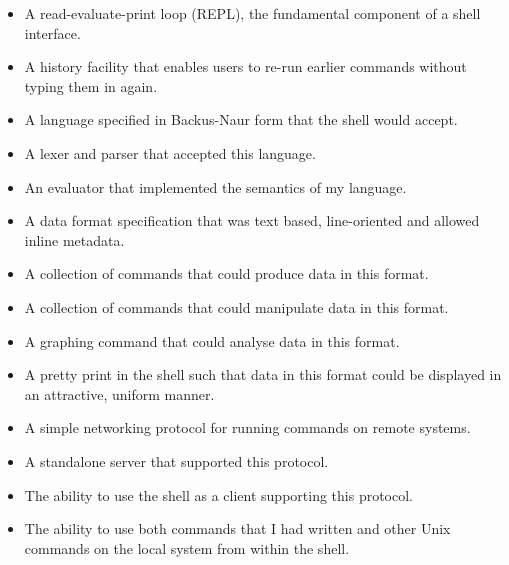 \documentclass[12pt,twoside,notitlepage]{report}
\begin{document}
\begin{itemize}
\item A read-evaluate-print loop (REPL), the fundamental component of
  a shell interface.
\item A history facility that enables users to re-run earlier commands
  without typing them in again.
\item A language specified in Backus-Naur form that the shell would
  accept.
\item A lexer and parser that accepted this language.
\item An evaluator that implemented the semantics of my language.
\item A data format specification that was text based, line-oriented
  and allowed inline metadata.
\item A collection of commands that could produce data in this format.
\item A collection of commands that could manipulate data in this
  format.
\item A graphing command that could analyse data in this format.
\item A pretty print in the shell such that data in this format could
  be displayed in an attractive, uniform manner.
\item A simple networking protocol for running commands on remote
  systems.
\item A standalone server that supported this protocol.
\item The ability to use the shell as a client supporting this
  protocol.
\item The ability to use both commands that I had written and other
  Unix commands on the local system from within the shell.
\end{itemize}



\end{document}
